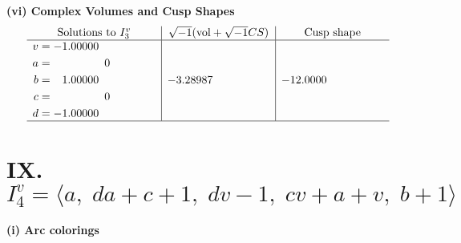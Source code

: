 \documentclass[1p]{elsarticle_modified}
\theoremstyle{definition}
\newcommand{\I}{\sqrt{-1}}
\begin{document}
\newpage\flushleft \textbf{(vi) Complex Volumes and Cusp Shapes}
$$\begin{array}{c|c|c}  
\text{Solutions to }I^v_{3}& \I (\text{vol} + \sqrt{-1}CS) & \text{Cusp shape}\\
 \hline 
\begin{aligned}
v &= -1.00000\phantom{ +0.000000I} \\
a &= \phantom{-0.000000 } 0 \\
b &= \phantom{-}1.00000\phantom{ +0.000000I} \\
c &= \phantom{-0.000000 } 0 \\
d &= -1.00000\phantom{ +0.000000I}\end{aligned}
 & -3.28987\phantom{ +0.000000I} & -12.0000\phantom{ +0.000000I}\\
 \hline 
 \end{array}$$\newpage\newpage\renewcommand{\arraystretch}{1}
\centering \section*{IX. $I^v_{4}= \langle a,\;d a+c+1,\;d v-1,\;c v+a+v,\;b+1 \rangle$}
\flushleft \textbf{(i) Arc colorings}\\
\end{document}
